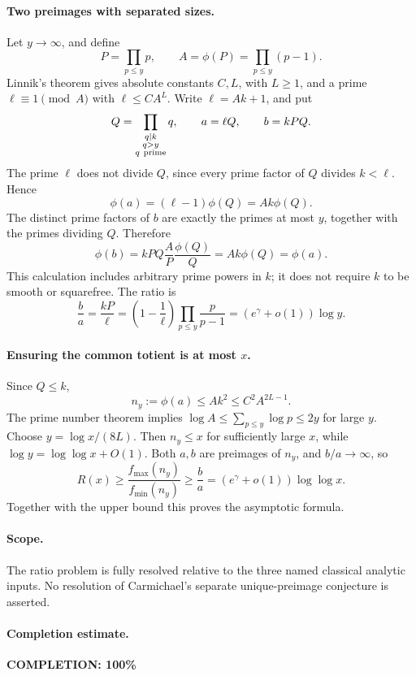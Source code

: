 \paragraph{Two preimages with separated sizes.}
Let \(y\to\infty\), and define
\[
 P=\prod_{p\leq y}p,\qquad A=\phi(P)=\prod_{p\leq y}(p-1).
\]
Linnik's theorem gives absolute constants \(C,L\), with \(L\geq1\),
and a prime \(\ell\equiv1\pmod A\) with \(\ell\leq CA^L\).
Write \(\ell=Ak+1\), and put
\[
 Q=\prod_{\substack{q\mid k\\q>y\\q\ {\rm prime}}}q,\qquad
 a=\ell Q,\qquad b=kPQ.
\]
The prime \(\ell\) does not divide \(Q\), since every prime
factor of \(Q\) divides \(k<\ell\). Hence
\[
 \phi(a)=(\ell-1)\phi(Q)=Ak\phi(Q).
\]
The distinct prime factors of \(b\) are exactly the primes at most
\(y\), together with the primes dividing \(Q\). Therefore
\[
 \phi(b)=kPQ\frac AP\frac{\phi(Q)}Q=Ak\phi(Q)=\phi(a).
\]
This calculation includes arbitrary prime powers in \(k\);
it does not require \(k\) to be smooth or squarefree.
The ratio is
\[
 \frac ba=\frac{kP}{\ell}
   =\left(1-\frac1\ell\right)\prod_{p\leq y}\frac p{p-1}
   =(e^\gamma+o(1))\log y.                                    \tag{1}
\]

\paragraph{Ensuring the common totient is at most \(x\).}
Since \(Q\leq k\),
\[
 n_y:=\phi(a)\leq Ak^2\leq C^2 A^{2L-1}.
\]
The prime number theorem implies
\(\log A\leq\sum_{p\leq y}\log p\leq2y\) for large \(y\).
Choose \(y=\log x/(8L)\). Then \(n_y\leq x\) for sufficiently
large \(x\), while \(\log y=\log\log x+O(1)\).
Both \(a,b\) are preimages of \(n_y\), and \(b/a\to\infty\), so
\[
 R(x)\geq\frac{f_{\max}(n_y)}{f_{\min}(n_y)}
       \geq\frac ba=(e^\gamma+o(1))\log\log x.
\]
Together with the upper bound this proves the asymptotic formula.

\paragraph{Scope.}
The ratio problem is fully resolved relative to the three named
classical analytic inputs. No resolution of Carmichael's separate
unique-preimage conjecture is asserted.

\paragraph{Completion estimate.}
\textbf{COMPLETION: 100\%}
